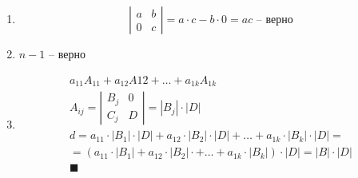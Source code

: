 \documentclass[12pt, fleqn]{article}
\begin{document}
\begin{enumerate}[1)]
	\item 
	\begin{equation*}
		\left|
		\begin{array}{cc}
			a&b\\
			0&c
		\end{array}
		\right|=a\cdot c-b\cdot0 = ac \text{ -- верно}
	\end{equation*}
	\item $n-1$ -- верно
	\item 
	\begin{multline*}
		a_{11}A_{11}+a_{12}A{12}+\dots+a_{1k}A_{1k}\\
		A_{ij}=\left|\begin{array}{cc}
			B_j&0\\
			C_j&D
		\end{array}\right|=\left|B_j\right|\cdot \left|D\right|\\
		d=a_{11}\cdot \left|B_1\right|\cdot \left|D\right|+a_{12}\cdot \left|B_2\right|\cdot \left|D\right|+\dots+a_{1k}\cdot \left|B_k\right|\cdot \left|D\right|=\\
		=\left(a_{11}\cdot \left|B_1\right|+a_{12}\cdot \left|B_2\right|\cdot +\dots+a_{1k}\cdot \left|B_k\right|\right)\cdot \left|D\right|=\left|B\right|\cdot \left|D\right|\\
		\blacksquare\\
	\end{multline*}
\end{enumerate}
\end{document}

